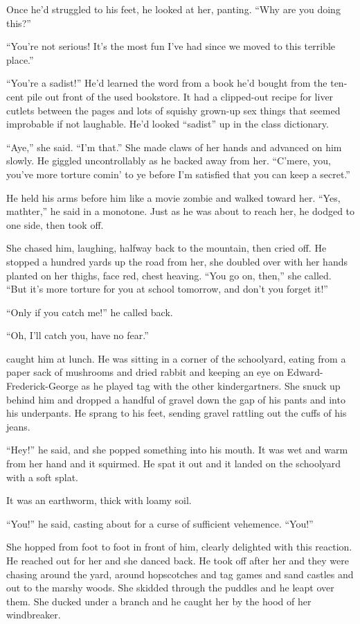 Once he'd struggled to his feet, he looked at her, panting.  ``Why are
you doing this?''

``You're not serious!  It's the most fun I've had since we moved to
this terrible place.''

``You're a sadist!'' He'd learned the word from a book he'd bought
from the ten-cent pile out front of the used bookstore.  It had a
clipped-out recipe for liver cutlets between the pages and lots of
squishy grown-up sex things that seemed improbable if not laughable. 
He'd looked ``sadist'' up in the class dictionary.

``Aye,'' she said.  ``I'm that.'' She made claws of her hands and
advanced on him slowly.  He giggled uncontrollably as he backed away
from her.  ``C'mere, you, you've more torture comin' to ye before I'm
satisfied that you can keep a secret.''

He held his arms before him like a movie zombie and walked toward her. 
``Yes, mathter,'' he said in a monotone.  Just as he was about to
reach her, he dodged to one side, then took off.

She chased him, laughing, halfway back to the mountain, then cried
off.  He stopped a hundred yards up the road from her, she doubled
over with her hands planted on her thighs, face red, chest heaving. 
``You go on, then,'' she called.  ``But it's more torture for you at
school tomorrow, and don't you forget it!''

``Only if you catch me!'' he called back.

``Oh, I'll catch you, have no fear.''

 caught him at lunch.  He was sitting in a corner of the
schoolyard, eating from a paper sack of mushrooms and dried rabbit and
keeping an eye on Edward-Frederick-George as he played tag with the
other kindergartners.  She snuck up behind him and dropped a handful
of gravel down the gap of his pants and into his underpants.  He
sprang to his feet, sending gravel rattling out the cuffs of his
jeans.

``Hey!'' he said, and she popped something into his mouth.  It was wet
and warm from her hand and it squirmed.  He spat it out and it landed
on the schoolyard with a soft splat.

It was an earthworm, thick with loamy soil.

``You!'' he said, casting about for a curse of sufficient vehemence. 
``You!''

She hopped from foot to foot in front of him, clearly delighted with
this reaction.  He reached out for her and she danced back.  He took
off after her and they were chasing around the yard, around
hopscotches and tag games and sand castles and out to the marshy
woods.  She skidded through the puddles and he leapt over them.  She
ducked under a branch and he caught her by the hood of her
windbreaker.

